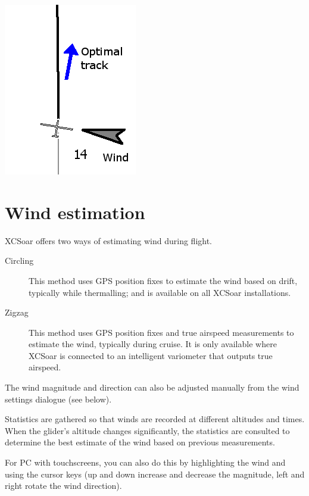 \begin{center}
\includegraphics[angle=0,width=0.4\linewidth,keepaspectratio='true']{figures/optwind.png}


\end{center}

\section{Wind estimation}\label{sec:wind-estimation}

XCSoar offers two ways of estimating wind during flight.
\begin{description}
\item[Circling]  This method uses GPS position fixes to estimate the wind
  based on drift, typically while thermalling; and is available on all
  XCSoar installations.
\item[Zigzag]  This method uses GPS position fixes and true airspeed measurements
  to estimate the wind, typically during cruise.  It is only available where
  XCSoar is connected to an intelligent variometer that outputs true airspeed.
\end{description}

The wind magnitude and direction can also be adjusted manually from the
wind settings dialogue (see below).  

Statistics are gathered so that winds are recorded at different
altitudes and times.  When the glider's altitude changes significantly,
the statistics are consulted to determine the best estimate of the
wind based on previous measurements.

For PC with touchscreens, you can
also do this by highlighting the wind {\InfoBox} and using the cursor
keys (up and down increase and decrease the magnitude, left and right
rotate the wind direction).

